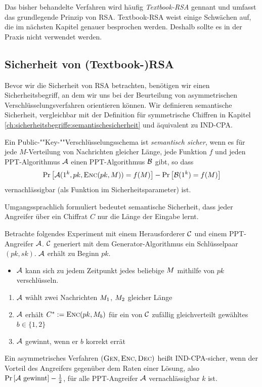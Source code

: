 Das bisher behandelte Verfahren wird häufig \textit{Textbook-RSA} gennant und
umfasst das grundlegende Prinzip von RSA. Textbook-RSA weist einige
Schwächen auf, die im nächsten Kapitel genauer besprochen
werden. Deshalb sollte es in der Praxis nicht verwendet werden.

\subsection{Sicherheit von (Textbook-)RSA}
\label{ch:asymmenc:rsa:sicherheit}
Bevor wir die Sicherheit von RSA betrachten, benötigen wir einen Sicherheitsbegriff, an dem wir uns bei der Beurteilung von asymmetrischen
Verschlüsselungsverfahren orientieren können. Wir definieren semantische Sicherheit, vergleichbar mit der Definition für symmetrische Chiffren in Kapitel \ref{ch:sicherheitsbegriffe:semantischesicherheit} und äquivalent zu IND-CPA.
\begin{definition}
Ein Pub\-lic-""Key-""Ver\-schlüs\-sel\-ungs\-sche\-ma ist \textit{semantisch sicher}, wenn es für jede $M$-Verteilung von Nachrichten gleicher Länge, jede
Funktion $f$ und jeden PPT-Algorithmus $\mathcal{A}$ einen PPT-Algorithmus $\mathcal{B}$ gibt, so dass
\begin{equation*}
\Pr\left[\mathcal{A}(1^k, pk, \textsc{Enc}(pk, M)) = f(M)\right] - \Pr\left[\mathcal{B}(1^k) = f(M)\right]
\end{equation*}
vernachlässigbar (als Funktion im Sicherheitsparameter) ist.
\end{definition}

Umgangssprachlich formuliert bedeutet semantische Sicherheit, dass jeder
Angreifer über ein Chiffrat $C$ nur die Länge der Eingabe lernt. 

\begin{definition}
  Betrachte folgendes Experiment mit einem Herausforderer $\mathcal{C}$ und einem
  PPT-Angreifer $\mathcal{A}$. $\mathcal{C}$ generiert mit dem Generator-Algorithmus ein
  Schlüsselpaar $(pk, sk)$. $\mathcal{A}$ erhält zu Beginn $pk$.
  \begin{itemize}
  \item $\mathcal{A}$ kann sich zu jedem Zeitpunkt jedes beliebige $M$
    mithilfe von $pk$ verschlüsseln.
  \end{itemize}
  \begin{enumerate}
  \item $\mathcal{A}$ wählt zwei Nachrichten $M_1$, $M_2$ gleicher
    Länge
  \item $\mathcal{A}$ erhält $C^{*} := \textsc{Enc}(pk, M_{b})$ für ein von
    $\mathcal{C}$ zufällig gleichverteilt gewähltes $b \in \{1, 2\}$
  \item $\mathcal{A}$ gewinnt, wenn er $b$ korrekt errät
  \end{enumerate} Ein asymmetrisches Verfahren $(\textsc{Gen}, \textsc{Enc}, \textsc{Dec})$ heißt IND-CPA-sicher, wenn der Vorteil des
  Angreifers gegenüber dem Raten einer Lösung, also $\Pr \left[ \mathcal{A}
    \textnormal{ gewinnt} \right] - \frac{1}{2}$, für alle PPT-Angreifer $\mathcal{A}$
  vernachlässigbar $k$ ist.
\end{definition}

